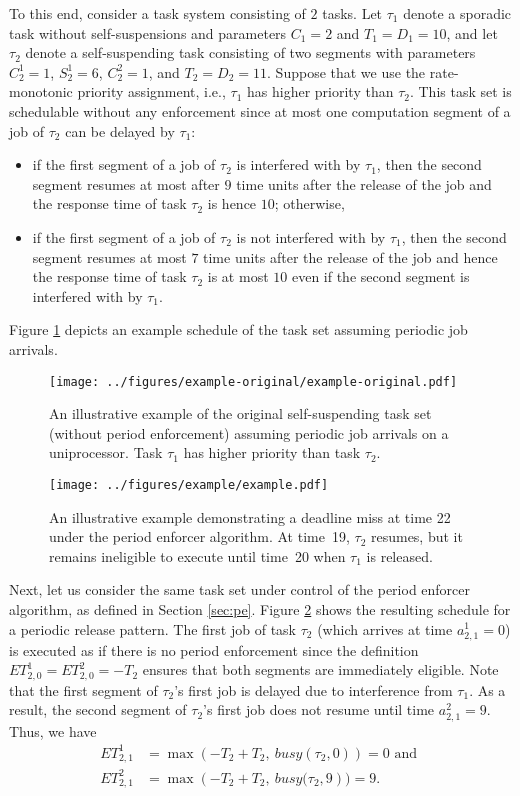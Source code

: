 To this end, consider a task system consisting of $2$ tasks. Let $\tau_1$ denote a sporadic task without self-suspensions and parameters $C_1 = 2$ and $T_1=D_1=10$, and let $\tau_2$ denote a self-suspending task consisting of two segments with parameters  $C_2^1 = 1$,  $S_2^1 = 6$, $C_2^2=1$, and $ T_2=D_2=11$. Suppose that we use the rate-monotonic priority assignment, i.e., $\tau_1$ has higher priority than $\tau_2$. This task set is schedulable without any enforcement since at most one computation segment of a job of $\tau_2$ can be delayed by $\tau_1$: 
\begin{itemize}
	\item if the first segment of a job of $\tau_2$ is interfered with by $\tau_1$, then the second segment resumes at most after $9$ time units after the release of the job and the response time of task $\tau_2$ is hence $10$; otherwise,
	\item  if the first segment of a job of $\tau_2$ is not interfered with by $\tau_1$, then the second segment resumes at most $7$ time units after the release of the job and hence the  response time of task $\tau_2$ is at most $10$ even if the second segment is interfered with by $\tau_1$.
\end{itemize}
Figure \ref{fig:example-original} depicts an example schedule of the task set assuming periodic job arrivals.


\ifpaper
\begin{figure}[t]
  \centering
  \texttt{[image: ../figures/example-original/example-original.pdf]}
  \caption{An illustrative example of the original self-suspending task set (without period enforcement) assuming periodic job arrivals on a uniprocessor. Task $\tau_1$ has higher priority than task $\tau_2$.}
  \label{fig:example-original}
  \end{figure}
\begin{figure}[t]
  \centering
  \texttt{[image: ../figures/example/example.pdf]}
  \caption{An illustrative example demonstrating a deadline miss at time 22
    under the period enforcer algorithm. At time~19, $\tau_2$ resumes, but it remains ineligible to execute until time~20 when $\tau_1$ is released.}
\label{fig:example}  
\end{figure}
\fi

Next, let us consider the same task set under control of the period enforcer algorithm, as defined in Section \ref{sec:pe}.
Figure \ref{fig:example} shows the resulting schedule for a periodic release pattern. The first job of task $\tau_2$ (which arrives at time $a^1_{2,1} =  0$) is executed as if there is no period enforcement since the definition $ET_{2,0}^1 = ET_{2,0}^2 = -T_2$ ensures that both segments are immediately eligible. Note that the first segment of $\tau_2$'s first job is delayed due to interference from $\tau_1$. As a result, the second segment of $\tau_2$'s first job does not resume until time $a^2_{2,1} = 9$. Thus, we have
\begin{align*}
	ET_{2,1}^1 & = \max\left(-T_2 + T_2,\ \mathit{busy}(\tau_2, 0)\right) = 0  \text{ and }
\\
	ET_{2,1}^2 & = \max\left(-T_2 + T_2,\ \mathit{busy}(\tau_2, 9\right) ) = 9.
\end{align*}

